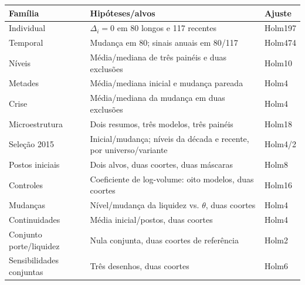 \begin{tabular}{p{}p{}p{}}
\toprule
Família & Hipóteses/alvos & Ajuste\\\midrule
Individual & $\Delta_i=0$ em 80 longos e 117 recentes & Holm197\\
Temporal & Mudança em 80; sinais anuais em 80/117 & Holm474\\
Níveis & Média/mediana de três painéis e duas exclusões & Holm10\\
Metades & Média/mediana inicial e mudança pareada & Holm4\\
Crise & Média/mediana da mudança em duas exclusões & Holm4\\
Microestrutura & Dois resumos, três modelos, três painéis & Holm18\\
Seleção 2015 & Inicial/mudança; níveis da década e recente, por universo/variante & Holm4/2\\
Postos iniciais & Dois alvos, duas coortes, duas máscaras & Holm8\\
Controles & Coeficiente de log-volume: oito modelos, duas coortes & Holm16\\
Mudanças & Nível/mudança da liquidez vs. $\theta$, duas coortes & Holm4\\
Continuidades & Média inicial/postos, duas coortes & Holm4\\
Conjunto porte/liquidez & Nula conjunta, duas coortes de referência & Holm2\\
Sensibilidades conjuntas & Três desenhos, duas coortes & Holm6\\\bottomrule
\end{tabular}
